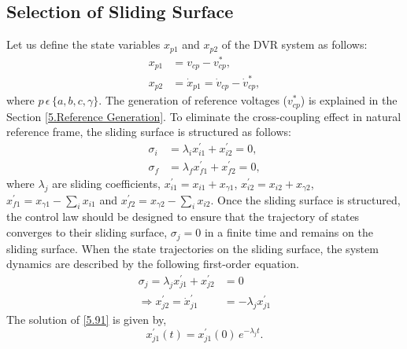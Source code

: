 \subsection{Selection of Sliding Surface} 
Let us define the state variables $x_{p1}$ and $x_{p2}$ of the DVR system as follows: \vspace*{-0.5cm}
\begin{equation} \label{5.8} %
\begin{aligned}
x_{p1} & = v_{cp} - v^{*}_{cp}, \\
x_{p2} & = \dot{x}_{p1} = \dot{v}_{cp} - \dot{v}^{*}_{cp},
\end{aligned} 
\end{equation}
where $p\, \epsilon \, \{a,b,c,\gamma\}$. The generation of reference voltages ($v^{*}_{cp}$) is explained in the Section \ref{5.Reference Generation}. To eliminate the cross-coupling effect in natural reference frame, the sliding surface is structured as follows:
\begin{equation} \label{5.9} %
\begin{aligned}
\sigma_{i} & = \lambda_i x^{\prime}_{i1} + x^{\prime}_{i2}=0,\\
\sigma_{f} & = \lambda_f x^{\prime}_{f1} + x^{\prime}_{f2}=0,
\end{aligned}
\end{equation}
where $\lambda_j $ are sliding coefficients, $x^{\prime}_{i1} = x_{i1} + x_{\gamma 1}$, $x^{\prime}_{i2} = x_{i2} + x_{\gamma 2}$, $x^{\prime}_{f1} = x_{\gamma 1} - \sum_i x_{i1}$ and $x^{\prime}_{f2} = x_{\gamma 2} - \sum_i x_{i2}$. Once the sliding surface is structured, the control law should be designed to ensure that the trajectory of states converges to their sliding surface, $\sigma_j = 0$ in a finite time and remains on the sliding surface. When the state trajectories on the sliding surface, the system dynamics are described by the following first-order equation.
\begin{equation} \label{5.91} %
\begin{aligned}
\sigma_{j}  = \lambda_j x^{\prime}_{j1} + x^{\prime}_{j2} & =0 \\
\Rightarrow  x^{\prime}_{j2}  = \dot{x}^{\prime}_{j1} & = -\lambda_j x^{\prime}_{j1}
\end{aligned} 
\end{equation}
The solution of \eqref{5.91} is given by,
\begin{equation} \label{5.92} %
x^{\prime}_{j1}(t)  = x^{\prime}_{j1}(0)\,e^{-\lambda_j t}.
\end{equation}
